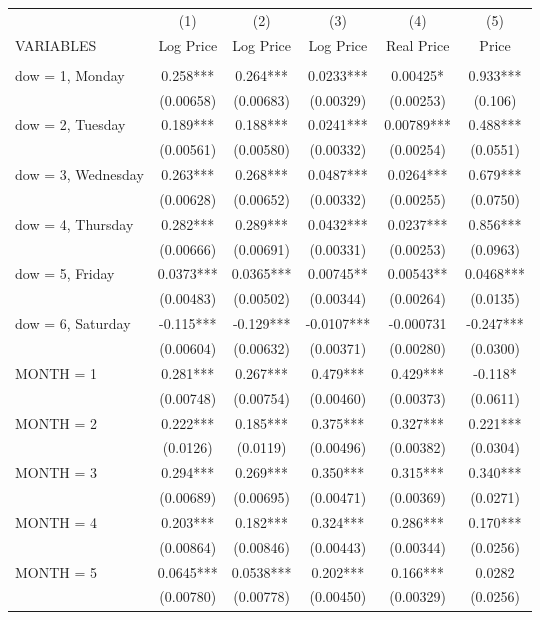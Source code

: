 \begin{tabular}{lccccc} \hline
 & (1) & (2) & (3) & (4) & (5) \\
VARIABLES & Log Price & Log Price & Log Price & Real Price & Price \\ \hline
 &  &  &  &  &  \\
dow = 1, Monday & 0.258*** & 0.264*** & 0.0233*** & 0.00425* & 0.933*** \\
 & (0.00658) & (0.00683) & (0.00329) & (0.00253) & (0.106) \\
dow = 2, Tuesday & 0.189*** & 0.188*** & 0.0241*** & 0.00789*** & 0.488*** \\
 & (0.00561) & (0.00580) & (0.00332) & (0.00254) & (0.0551) \\
dow = 3, Wednesday & 0.263*** & 0.268*** & 0.0487*** & 0.0264*** & 0.679*** \\
 & (0.00628) & (0.00652) & (0.00332) & (0.00255) & (0.0750) \\
dow = 4, Thursday & 0.282*** & 0.289*** & 0.0432*** & 0.0237*** & 0.856*** \\
 & (0.00666) & (0.00691) & (0.00331) & (0.00253) & (0.0963) \\
dow = 5, Friday & 0.0373*** & 0.0365*** & 0.00745** & 0.00543** & 0.0468*** \\
 & (0.00483) & (0.00502) & (0.00344) & (0.00264) & (0.0135) \\
dow = 6, Saturday & -0.115*** & -0.129*** & -0.0107*** & -0.000731 & -0.247*** \\
 & (0.00604) & (0.00632) & (0.00371) & (0.00280) & (0.0300) \\
MONTH = 1 & 0.281*** & 0.267*** & 0.479*** & 0.429*** & -0.118* \\
 & (0.00748) & (0.00754) & (0.00460) & (0.00373) & (0.0611) \\
MONTH = 2 & 0.222*** & 0.185*** & 0.375*** & 0.327*** & 0.221*** \\
 & (0.0126) & (0.0119) & (0.00496) & (0.00382) & (0.0304) \\
MONTH = 3 & 0.294*** & 0.269*** & 0.350*** & 0.315*** & 0.340*** \\
 & (0.00689) & (0.00695) & (0.00471) & (0.00369) & (0.0271) \\
MONTH = 4 & 0.203*** & 0.182*** & 0.324*** & 0.286*** & 0.170*** \\
 & (0.00864) & (0.00846) & (0.00443) & (0.00344) & (0.0256) \\
MONTH = 5 & 0.0645*** & 0.0538*** & 0.202*** & 0.166*** & 0.0282 \\
 & (0.00780) & (0.00778) & (0.00450) & (0.00329) & (0.0256) \\

\end{tabular}
